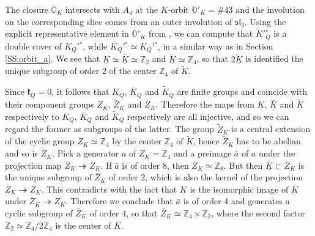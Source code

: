 \documentclass[12pt]{amsart}
\newcommand{\Orb}{\mathbb{O}}
\newcommand{\Z}{\mathbb{Z}}
\newcommand{\kf}{\mathfrak{k}}
\newcommand{\R}{\mathbb{R}}
\newcommand{\slf}{\mathfrak{sl}}
\theoremstyle{definition}
\numberwithin{equation}{section}
\begin{document}
The closure $\overline{\Orb}_K$ intersects with $A_4$ at the $K$-orbit $\Orb'_K  = \# 43$ and the involution on the corresponding slice comes from an outer involution of $\slf_3$. Using the explicit representative element in $\Orb'_K$ from \cite[Table 3]{Dk5}, we can compute that $\tilde{K}'^\circ_Q$ is a double cover of $K_Q'^\circ$, while $\bar{K}_Q'^\circ \simeq K_Q'^\circ$, in a similar way as in Section \ref{SS:orbit_a}. We see that $\underline{K} \simeq \underline{\bar{K}} \simeq \Z_2$ and $\underline{\tilde{K}} \simeq \Z_4$, so that $2 \underline{\tilde{K}}$ is identified the unique subgroup of order $2$ of the center $\Z_4$ of $\tilde{K}$.



Since $\kf_Q=0$, it follows that $K_Q$, $\bar{K}_Q$ and $\tilde{K}_Q$ are finite groups and coincide with their component groups $Z_K$, $\bar{Z}_K$ and $\tilde{Z}_K$. Therefore the maps from $\underline{K}$, $\underline{\bar{K}}$ and $\underline{\tilde{K}}$ respectively to $K_Q$, $\bar{K}_Q$ and $\tilde{K}_Q$ respectively are all injective, and so we can regard the former as subgroups of the latter. The group $\tilde{Z}_K$ is a central extension of the cyclic group $Z_K \simeq \Z_4$ by the center $\Z_4$ of $\tilde{K}$, hence $\tilde{Z}_K$ has to be abelian and so is $\bar{Z}_K$.
Pick a generator $a$ of $Z_K = \Z_4$ and a preimage $\bar{a}$ of $a$ under the projection map $\bar{Z}_K \twoheadrightarrow Z_K$. If $\bar{a}$ is of order $8$, then $\bar{Z}_K \simeq \Z_8$. But then $\underline{\bar{K}} \subset \bar{Z}_K$ is the unique subgroup of $\bar{Z}_K$ of order $2$, which is also the kernel of the projection $\bar{Z}_K \twoheadrightarrow Z_K$. This contradicts with the fact that $\underline{K}$ is the isomorphic image of $\underline{\bar{K}}$ under $\bar{Z}_K \twoheadrightarrow Z_K$. Therefore we conclude that $\bar{a}$ is of order $4$ and generates a cyclic subgroup of $\bar{Z}_K$ of order $4$, so that $\bar{Z}_K \simeq \Z_4 \times \Z_2$, where the second factor $\Z_2 \simeq \Z_4 / 2 \Z_4$ is the center of $\bar{K}$.
\end{document}
